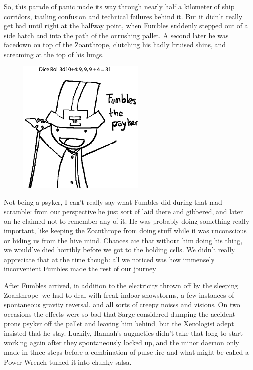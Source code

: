 So, this parade of panic made its way through nearly half a kilometer of ship corridors, trailing confusion and technical failures behind it. 
But it didn't really get bad until right at the halfway point, when Fumbles suddenly stepped out of a side hatch and into the path of the onrushing pallet. 
A second later he was facedown on top of the Zoanthrope, clutching his badly bruised shins, and screaming at the top of his lungs.
\begin{figure}
	\begin{center}
		\includegraphics[width=\figwidth]{pics/12/65.png}
	\end{center}
\end{figure}
Not being a psyker, I can't really say what Fumbles did during that mad scramble: 
from our perspective he just sort of laid there and gibbered, and later on he claimed not to remember any of it. 
He was probably doing something really important, like keeping the Zoanthrope from doing stuff while it was unconscious or hiding us from the hive mind. 
Chances are that without him doing his thing, we would've died horribly before we got to the holding cells. 
We didn't really appreciate that at the time though: 
all we noticed was how immensely inconvenient Fumbles made the rest of our journey.

After Fumbles arrived, in addition to the electricity thrown off by the sleeping Zoanthrope, we had to deal with freak indoor snowstorms, a few instances of spontaneous gravity reversal, and all sorts of creepy noises and visions. 
On two occasions the effects were so bad that Sarge considered dumping the accident-prone psyker off the pallet and leaving him behind, but the Xenologist adept insisted that he stay. 
Luckily, Hannah's augmetics didn't take that long to start working again after they spontaneously locked up, and the minor daemon only made in three steps before a combination of pulse-fire and what might be called a Power Wrench turned it into chunky salsa.

